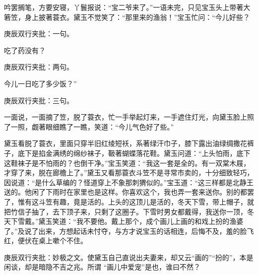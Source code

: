 \begin{parag}

    吟罢搁笔，方要安寝，丫鬟报说：“宝二爷来了。”一语未完，只见宝玉头上带著大箬笠，身上披著蓑衣。黛玉不觉笑了：“那里来的渔翁！”宝玉忙问：“今儿好些？\begin{note}庚辰双行夹批：一句。\end{note}吃了药没有？\begin{note}庚辰双行夹批：两句。\end{note}今儿一日吃了多少饭？”\begin{note}庚辰双行夹批：三句。\end{note}一面说，一面摘了笠，脱了蓑衣，忙一手举起灯来，一手遮住灯光，向黛玉脸上照了一照，觑著眼细瞧了一瞧，笑道：“今儿气色好了些。”
\end{parag}


\begin{parag}


    黛玉看脱了蓑衣，里面只穿半旧红绫短袄，系著绿汗巾子，膝下露出油绿绸撒花裤子，底下是掐金满绣的绵纱袜子，靸著蝴蝶落花鞋。黛玉问道：“上头怕雨，底下这鞋袜子是不怕雨的？也倒干净。”宝玉笑道：“我这一套是全的。有一双棠木屐，才穿了来，脱在廊檐上了。”黛玉又看那蓑衣斗笠不是寻常市卖的，十分细致轻巧，因说道：“是什么草编的？怪道穿上不象那刺猬似的。”宝玉道：“这三样都是北静王送的。他闲了下雨时在家里也是这样。你喜欢这个，我也弄一套来送你。别的都罢了，惟有这斗笠有趣，竟是活的。上头的这顶儿是活的，冬天下雪，带上帽子，就把竹信子抽了，去下顶子来，只剩了这圈子。下雪时男女都戴得，我送你一顶，冬天下雪戴。”黛玉笑道：“我不要他。戴上那个，成个画儿上画的和戏上扮的渔婆了。”及说了出来，方想起话未忖夺，与方才说宝玉的话相连，后悔不及，羞的脸飞红，便伏在桌上嗽个不住。\begin{note}庚辰双行夹批：妙极之文。使黛玉自己直说出夫妻来，却又云“画的”“扮的”，本是闲谈，却是暗隐不吉之兆。所谓 “画儿中爱宠”是也，谁曰不然？\end{note}
\end{parag}


